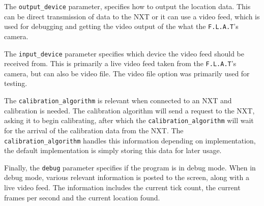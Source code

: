 The \texttt{output\_device} parameter, specifies how to output the location data.
This can be direct transmission of data to the NXT or it can use a video feed, which is used for debugging and getting the video output of the what the \texttt{F.L.A.T}'s camera.

The \texttt{input\_device} parameter specifies which device the video feed should be received from. 
This is primarily a live video feed taken from the \texttt{F.L.A.T}'s camera, but can also be video file.
The video file option was primarily used for testing.

The \texttt{calibration\_algorithm} is relevant when connected to an NXT and calibration is needed. 
The calibration algorithm will send a request to the NXT, asking it to begin calibrating, after which the \texttt{calibration\_algorithm} will wait for the arrival of the calibration data from the NXT. 
The \texttt{calibration\_algorithm} handles this information depending on implementation, the default implementation is simply storing this data for later usage.

Finally, the \texttt{debug} parameter specifies if the program is in debug mode.
When in debug mode, various relevant information is posted to the screen, along with a live video feed.
The information includes the current tick count, the current frames per second and the current location found.

